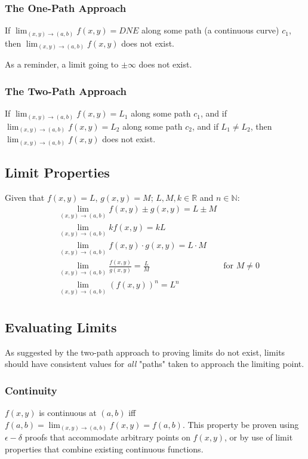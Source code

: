 \documentclass{article}
\begin{document}
\subsubsection{The One-Path Approach}
If \(\lim_{(x,y)\to(a,b)}f(x,y) = DNE\) along some path (a continuous curve) $c_1$, then \(\lim_{(x,y)\to(a,b)}f(x,y)\) does not exist.

As a reminder, a limit going to $\pm\infty$ does not exist.

\subsubsection{The Two-Path Approach}
If \(\lim_{(x,y)\to(a,b)}f(x,y) = L_1\) along some path $c_1$, and if \(\lim_{(x,y)\to(a,b)}f(x,y) = L_2\) along some path $c_2$, and if $L_1\ne L_2$, then \(\lim_{(x,y)\to(a,b)}f(x,y)\) does not exist.

\subsection{Limit Properties}
Given that $f(x,y)=L$, $g(x,y)=M$; $L,M,k\in\mathbb{R}$ and $n\in\mathbb{N}$:
\begin{align*}
    &\lim_{(x,y)\to(a,b)}f(x,y)\pm g(x,y) = L \pm M \\
    &\lim_{(x,y)\to(a,b)}kf(x,y) = kL \\
    &\lim_{(x,y)\to(a,b)}f(x,y) \cdot g(x,y) = L \cdot M \\
    &\lim_{(x,y)\to(a,b)}\frac{f(x,y)}{g(x,y)} = \frac{L}{M} & \text{for } M\ne0 \\
    &\lim_{(x,y)\to(a,b)}(f(x,y))^n = L^n \\
\end{align*}

\subsection{Evaluating Limits}
As suggested by the two-path approach to proving limits do not exist, limits should have consistent values for \emph{all} "paths" taken to approach the limiting point.

\subsubsection{Continuity}
$f(x,y)$ is continuous at $(a,b)$ iff $f(a,b)=\lim_{(x,y)\to(a,b)}f(x,y) = f(a,b)$. This property be proven using $\epsilon-\delta$ proofs that accommodate arbitrary points on $f(x,y)$, or by use of limit properties that combine existing continuous functions.
\end{document}
